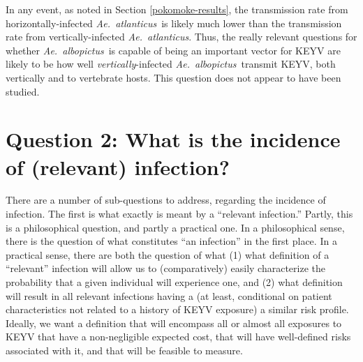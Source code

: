 \documentclass[12pt]{article}
\newcommand{\alb}{\textit{Ae.\ albopictus}}
\newcommand{\atl}{\textit{Ae.\ atlanticus}}
\newcommand{\cjh}{\textcolor{blue}{cjh}}
\newcommand{\tjh}{\textcolor{red}{tjh}}
\newcommand{\msg}[3]{(#1 $\rightarrow$ #2: #3)}
\newcommand{\mcc}[1]{\msg\cjh\cjh{#1}}
\newcommand{\mtc}[1]{\msg\tjh\cjh{#1}}
\begin{document}
        In any event, as noted in Section \ref{pokomoke-results}, the transmission rate from horizontally-infected \atl\ is likely much lower than the transmission rate from vertically-infected \atl. Thus, the really relevant questions for whether \alb\ is capable of being an important vector for KEYV are likely to be how well \textit{vertically}-infected \alb\ transmit KEYV, both vertically and to vertebrate hosts. This question does not appear to have been studied.

    \section[Incidence of infection]{Question 2: What is the incidence of (relevant) infection?}
        \label{incidence}

        There are a number of sub-questions to address, regarding the incidence of infection. The first is what exactly is meant by a ``relevant infection.'' Partly, this is a philosophical question, and partly a practical one. In a philosophical sense, there is the question of what constitutes ``an infection'' in the first place. In a practical sense, there are both the question of what (1) what definition of a ``relevant'' infection will allow us to (comparatively) easily characterize the probability that a given individual will experience one, and (2) what definition will result in all relevant infections having a (at least, conditional on patient characteristics not related to a history of KEYV exposure) a similar risk profile. Ideally, we want a definition that will encompass all or almost all exposures to KEYV that have a non-negligible expected cost, that will have well-defined risks associated with it, and that will be feasible to measure.
\end{document}
